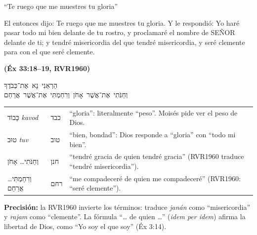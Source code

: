\documentclass[hyperref={bookmarks=false},aspectratio=169]{beamer}
\newcommand{\heb}[1]{\mbox{\foreignlanguage{hebrew}{#1}}}
\newcommand{\SENOR}{S{\fontsize{0.78em}{1em}\selectfont EÑOR}}
\newcommand{\fuente}[1]{\par\hfill{\upshape\bfseries\footnotesize\textcolor{azul}{#1}}}
\newcommand{\precision}[1]{{\footnotesize\color{gris}\textbf{Precisión:} #1}}
\begin{document}
\begin{frame}{``Te ruego que me muestres tu gloria''}
\begin{cita}El entonces dijo: Te ruego que me muestres tu gloria. Y le respondió: Yo haré pasar todo mi bien delante de tu rostro, y proclamaré el nombre de \SENOR{} delante de ti; y tendré misericordia del que tendré misericordia, y seré clemente para con el que seré clemente.\fuente{(Éx 33:18--19, RVR1960)}\end{cita}
\begin{center}\heb{הַרְאֵנִי נָא אֶת־כְּבֹדֶךָ}\\[2pt]\heb{וְחַנֹּתִי אֶת־אֲשֶׁר אָחֹן וְרִחַמְתִּי אֶת־אֲשֶׁר אֲרַחֵם}\end{center}
\scriptsize\renewcommand{\arraystretch}{1.15}
\begin{tabular}{@{}>{\RaggedRight\arraybackslash}p{2.6cm}>{\RaggedRight\arraybackslash}p{1.1cm}>{\RaggedRight\arraybackslash}p{8.0cm}@{}}
\toprule
\heb{כָּבוֹד} \emph{kavod} & \heb{כבד} & ``gloria'': literalmente ``peso''. Moisés pide ver el peso de Dios. \\
\heb{טוּב} \emph{tuv} & \heb{טוב} & ``bien, bondad'': Dios responde a ``gloria'' con ``todo mi bien''. \\
\heb{וְחַנֹּתִי}\ldots{} \heb{אָחֹן} & \heb{חנן} & ``tendré gracia de quien tendré gracia'' (RVR1960 traduce ``tendré misericordia''). \\
\heb{וְרִחַמְתִּי}\ldots{} \heb{אֲרַחֵם} & \heb{רחם} & ``me compadeceré de quien me compadeceré'' (RVR1960: ``seré clemente''). \\
\bottomrule
\end{tabular}\par\smallskip
\precision{la RVR1960 invierte los términos: traduce \emph{janán} como ``misericordia'' y \emph{rajam} como ``clemente''. La fórmula ``\ldots{} de quien \ldots'' (\emph{idem per idem}) afirma la libertad de Dios, como ``Yo soy el que soy'' (Éx 3:14).}
\end{frame}
\end{document}
